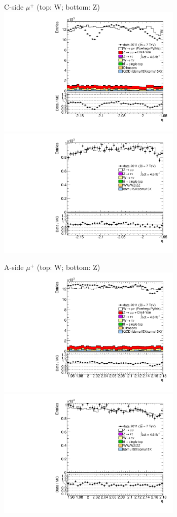 {{
C-side $\mu^{+}$ (top: W; bottom: Z)
\centering
\includegraphics[width=0.66\textwidth]{dates/20130306/figures/etaphi/W_10_C_stack_l_eta_POS} \\
\includegraphics[width=0.66\textwidth]{dates/20130306/figures/etaphi/Z_10_C_stack_lP_eta_ALL.pdf}

A-side $\mu^{+}$ (top: W; bottom: Z)
\centering
\includegraphics[width=0.66\textwidth]{dates/20130306/figures/etaphi/W_10_A_stack_l_eta_POS} \\
\includegraphics[width=0.66\textwidth]{dates/20130306/figures/etaphi/Z_10_A_stack_lP_eta_ALL.pdf} 

}}
